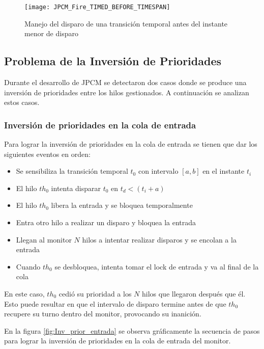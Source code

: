 \begin{figure}[H]
  \centering
  \texttt{[image: JPCM\_Fire\_TIMED\_BEFORE\_TIMESPAN]}
  \caption{Manejo del disparo de una transición temporal antes del instante
  menor de disparo}
  \label{fig:JPCM_Fire_TIMED_BEFORE_TIMESPAN}
\end{figure}

\subsection{Problema de la Inversión de Prioridades}

Durante el desarrollo de JPCM se detectaron dos casos donde se produce una
inversión de prioridades entre los hilos gestionados. A continuación se
analizan estos casos.

\subsubsection{Inversión de prioridades en la cola de entrada}
\label{inversion_prioridad_cola_entrada}
Para lograr la inversión de prioridades en la cola de entrada se tienen que dar
los siguientes eventos en orden:
\begin{itemize}
  \item Se sensibiliza la transición temporal $t_{0}$ con intervalo $[a,b]$ en
  el instante $t_{i}$
  \item El hilo $th_{0}$ intenta disparar $t_{0}$ en $t_{d} < (t_{i} + a)$
  \item El hilo $th_{0}$ libera la entrada y se bloquea temporalmente
  \item Entra otro hilo a realizar un disparo y bloquea la entrada
  \item Llegan al monitor $N$ hilos a intentar realizar disparos y se encolan a
  la entrada
  \item Cuando $th_{0}$ se desbloquea, intenta tomar el lock de entrada y va al
  final de la cola
\end{itemize}

En este caso, $th_{0}$ cedió su prioridad a los $N$ hilos que llegaron después
que él. Esto puede resultar en que el intervalo de disparo termine antes de que
$th_{0}$ recupere su turno dentro del monitor, provocando su inanición.

En la figura \ref{fig:Inv_prior_entrada} se observa gráficamente la secuencia de
pasos para lograr la inversión de prioridades en la cola de entrada del monitor.

